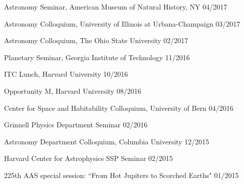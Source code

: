 \documentclass[12pt,letterpaper]{article}
\begin{document}
\begin{list}{}{\cvlist}
\item {Astronomy Seminar, American Museum of Natural History, NY \hfill 04/2017}
\item {Astronomy Colloquium, University of Illinois at Urbana-Champaign \hfill 03/2017}
\item {Astronomy Colloquium, The Ohio State University \hfill 02/2017}
\item {Planetary Seminar, Georgia Institute of Technology \hfill 11/2016}
\item {ITC Lunch, Harvard University \hfill 10/2016}
\item {Opportunity M, Harvard University \hfill 08/2016}
\item {Center for Space and Habitability Colloquium, University of Bern \hfill 04/2016}
\item {Grinnell Physics Department Seminar \hfill 02/2016}
\item {Astronomy Department Colloquium, Columbia University \hfill 12/2015}
\item {Harvard Center for Astrophysics SSP Seminar \hfill 02/2015}
\item {225th AAS special session: ``From Hot Jupiters to Scorched Earths" \hfill 01/2015}
\end{list}
\end{document}
